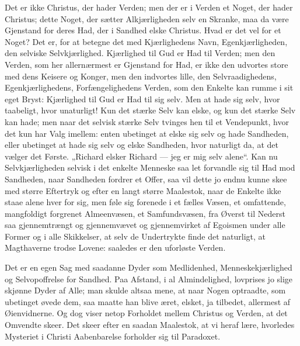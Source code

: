 \documentclass[12pt]{book}
\begin{document}
Det er ikke Christus, der hader Verden; men der er i Verden et
Noget, der hader Christus; dette Noget, der sætter Alkjærligheden
selv en Skranke, maa da være Gjenstand for deres Had, der i Sandhed
elske Christus. Hvad er det vel for et Noget? Det er, for at betegne
det med Kjærlighedens Navn, Egenkjærligheden, den selviske
Selvkjærlighed. Kjærlighed til Gud er Had til Verden; men den
Verden, som her allernærmest er Gjenstand for Had, er ikke den
udvortes store med dens Keisere og Konger, men den indvortes lille,
den Selvraadighedens, Egenkjærlighedens, Forfængelighedens Verden,
som den Enkelte kan rumme i sit eget Bryst: Kjærlighed til Gud er
Had til sig selv. Men at hade sig selv, hvor taabeligt, hvor
unaturligt! Kun det stærke Selv kan elske, og kun det stærke Selv
kan hade; men naar det selvisk stærke Selv tvinges hen til
et Vendepunkt, hvor det kun har Valg imellem: enten ubetinget at
elske sig selv og hade Sandheden, eller ubetinget at hade sig selv
og elske Sandheden, hvor naturligt da, at det vælger det Første.
„Richard elsker Richard --- jeg er mig selv alene“. Kan nu
Selvkjærligheden selvisk i det enkelte Menneske saa let forvandle
sig til Had mod Sandheden, naar Sandheden fordrer et Offer, saa vil
dette jo endnu kunne skee med større Eftertryk og efter en langt
større Maalestok, naar de Enkelte ikke staae alene hver for sig, men
føle sig forenede i et fælles Væsen, et omfattende, mangfoldigt
forgrenet Almeenvæsen, et Samfundsvæsen, fra Øverst til Nederst saa
gjennemtrængt og gjennemvævet og gjennemvirket af Egoismen under
alle Former og i alle Skikkelser, at selv de Undertrykte finde det
naturligt, at Magthaverne trodse Lovene: saaledes er den uforløste
Verden.

Det er en egen Sag med saadanne Dyder som Medlidenhed,
Menneskekjærlighed og Selvopoffrelse for Sandhed. Paa Afstand, i al
Almindelighed, lovprises jo slige skjønne Dyder af Alle; man skulde
altsaa mene, at naar Nogen optraadte, som ubetinget øvede dem, saa
maatte han blive æret, elsket, ja tilbedet, allermest af
Øienvidnerne. Og dog viser netop Forholdet mellem Christus og
Verden, at det Omvendte skeer. Det skeer efter en saadan Maalestok,
at vi heraf lære, hvorledes Mysteriet i Christi Aabenbarelse
forholder sig til Paradoxet.
\end{document}

